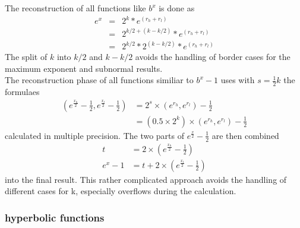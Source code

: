\documentclass[10pt,a4paper,final,oneside]{article}
\numberwithin{equation}{subsection}
\begin{document}
The reconstruction of all functions like $b^x$ is done as
\begin{equation}
  \begin{aligned}
    e ^ x & = & 2^k * e^{(r_h + r_l)} \\
          & = & 2^{k/2 + (k - k/2)} * e^{(r_h + r_l)} \\
          & = & 2^{k/2} * 2^{(k - k/2)} * e^{(r_h + r_l)}
  \end{aligned}
\end{equation}
The split of $k$ into $k/2$ and $k-k/2$ avoids the handling of
border cases for the maximum exponent and subnormal results.\\[10pt]
%
The reconstruction phase of all functions similiar to $b^x-1$ uses
with $ s  = \frac{1}{2} k $ the formulaes
\begin{equation}
  \begin{aligned}
    (e^{\frac{x_h}{2}}-\frac{1}{2}, e^{\frac{x_l}{2}}-\frac{1}{2})
    &=
    2^s \times (e^{r_h},e^{r_l}) - \frac{1}{2}\\
    &=
    (0.5 \times 2^k) \times (e^{r_h},e^{r_l}) - \frac{1}{2}
  \end{aligned}
\end{equation}
calculated in multiple precision. The two parts of
    $ e^{\frac{x}{2}} - \frac{1}{2} $ are then combined
\begin{equation}
  \begin{aligned}
    t &= 2 \times ( e^{\frac{x_h}{2}} -\frac{1}{2} ) \\
    e ^ x -1 &= t + 2 \times (e^{\frac{x_l}{2}} -\frac{1}{2})
  \end{aligned}
\end{equation}
into the final result. This rather complicated approach avoids the
handling of different cases for k, especially overflows during the
calculation.

\subsubsection{hyperbolic functions}
\end{document}
